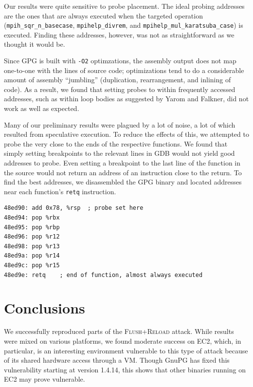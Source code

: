 \documentclass[11pt]{llncs}
\newcommand{\flushreload}{\textsc{Flush}+\textsc{Reload}}
\begin{document}
\lobwatermark

Our results were quite sensitive to probe placement. The ideal probing addresses
are the ones that are always executed when the targeted operation
(\texttt{mpih\_sqr\_n\_basecase}, \texttt{mpihelp\_divrem}, and
\texttt{mpihelp\_mul\_karatsuba\_case}) is executed. Finding these addresses,
however, was not as straightforward as we thought it would be.

Since GPG is built with \texttt{-O2} optimzations, the assembly output does not
map one-to-one with the lines of source code; optimizations tend to do a
considerable amount of assembly ``jumbling'' (duplication, rearrangement, and
inlining of code). As a result, we found that setting probes to within
frequently accessed addresses, such as within loop bodies as suggested by Yarom
and Falkner\cite{YF13}, did not work as well as expected.

Many of our preliminary results were plagued by a lot of noise, a lot of which
resulted from speculative execution. To reduce the effects of this, we attempted
to probe the very close to the ends of the respective functions. We found that
simply setting breakpoints to the relevant lines in GDB would not yield good
addresses to probe. Even setting a breakpoint to the last line of the function
in the source would not return an address of an instruction close to the return.
To find the best addresses, we disassembled the GPG binary and located addresses
near each function's \texttt{retq} instruction.

\begin{lstlisting}[language={[x86masm]Assembler},
    caption={A probe at \texttt{0x08ed90} near the end of
    \texttt{mpihelp\_divrem}, the modulus function, on EC2 hardware.},float=*]
48ed90: add 0x78, %rsp	; probe set here
48ed94: pop %rbx
48ed95: pop %rbp
48ed96: pop %r12
48ed98: pop %r13
48ed9a: pop %r14
48ed9c: pop %r15
48ed9e: retq	; end of function, almost always executed
\end{lstlisting}


\section{Conclusions}

We successfully reproduced parts of the \flushreload{} attack. While results
were mixed on various platforms, we found moderate success on EC2, which, in
particular, is an interesting environment vulnerable to this type of attack
because of its shared hardware access through a VM. Though GnuPG has fixed this
vulnerability starting at version 1.4.14, this shows that other binaries running
on EC2 may prove vulnerable.
\end{document}
